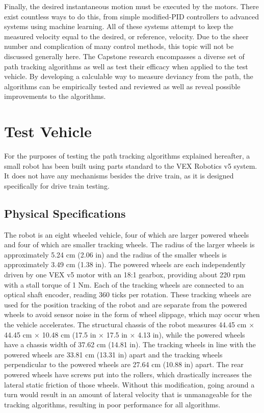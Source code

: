 \documentclass[mla8alt]{mla}
\begin{document}
\begin{paper}
Finally, the desired instantaneous motion must be executed by the motors. There exist countless ways to do this, from simple modified-PID controllers to advanced systems using machine learning. All of these systems attempt to keep the measured velocity equal to the desired, or reference, velocity. Due to the sheer number and complication of many control methods, this topic will not be discussed generally here. The Capstone research encompasses a diverse set of path tracking algorithms as well as test their efficacy when applied to the test vehicle. By developing a calculable way to measure deviancy from the path, the algorithms can be empirically tested and reviewed as well as reveal possible improvements to the algorithms. 

\section{Test Vehicle}

For the purposes of testing the path tracking algorithms explained hereafter, a small robot has been built using parts standard to the VEX Robotics v5 system. It does not have any mechanisms besides the drive train, as it is designed specifically for drive train testing.

\subsection{Physical Specifications}

The robot is an eight wheeled vehicle, four of which are larger powered wheels and four of which are smaller tracking wheels. The radius of the larger wheels is approximately 5.24 cm (2.06 in) and the radius of the smaller wheels is approximately 3.49 cm (1.38 in). The powered wheels are each independently driven by one VEX v5 motor with an 18:1 gearbox, providing about 220 rpm with a stall torque of 1 Nm. Each of the tracking wheels are connected to an optical shaft encoder, reading 360 ticks per rotation. These tracking wheels are used for the position tracking of the robot and are separate from the powered wheels to avoid sensor noise in the form of wheel slippage, which may occur when the vehicle accelerates. The structural chassis of the robot measures 44.45 cm $\times$ 44.45 cm $\times$ 10.48 cm (17.5 in $\times$ 17.5 in $\times$ 4.13 in), while the powered wheels have a chassis width of 37.62 cm (14.81 in). The tracking wheels in line with the powered wheels are 33.81 cm (13.31 in) apart and the tracking wheels perpendicular to the powered wheels are 27.64 cm (10.88 in) apart. The rear powered wheels have screws put into the rollers, which drastically increases the lateral static friction of those wheels. Without this modification, going around a turn would result in an amount of lateral velocity that is unmanageable for the tracking algorithms, resulting in poor performance for all algorithms. 


\end{paper}
\end{document}
